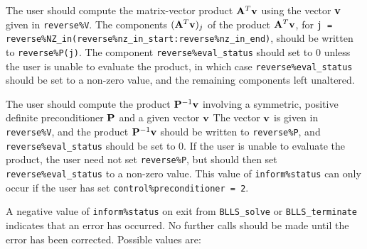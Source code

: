 \documentclass{galahad}
\newcommand{\packagename}{BLLS}
\begin{document}
\begin{description}
 The user should compute the matrix-vector product ${\mathbf{A}}^T {\mathbf{v}}$
     using the vector ${\mathbf{v}}$ given in {\tt reverse\%V}. The components
     $({\mathbf{A}}^T {\mathbf{v}})_j$ of the product ${\mathbf{A}}^T {\mathbf{v}}$, for
     {\tt j = reverse\%NZ\_in(reverse\%nz\_in\_start:reverse\%nz\_in\_end)},
     should be written to {\tt reverse\%P(j)}.
     The component {\tt reverse\%eval\_status} should set to 0 unless the
     user is unable to evaluate the product, in which case
     {\tt reverse\%eval\_status} should be set to a non-zero value, and the
      remaining components left unaltered.

 The user should compute the product ${\mathbf{P}}^{-1} {\mathbf{v}}$
     involving a symmetric, positive definite preconditioner ${\mathbf{P}}$
     and a given vector ${\mathbf{v}}$
     The vector ${\mathbf{v}}$ is given in {\tt reverse\%V}, and the
     product ${\mathbf{P}}^{-1} {\mathbf{v}}$ should be written to {\tt reverse\%P},
     and  {\tt reverse\%eval\_status} should be set to 0.
     If the user is unable to evaluate the product,
     the user need not set {\tt reverse\%P}, but
     should then set {\tt reverse\%eval\_status} to a non-zero value.
     This value of {\tt inform\%status} can only occur if the user
     has set {\tt control\%preconditioner = 2}.

\end{description}




\galerrors
A negative value of {\tt inform\%status} on exit from
{\tt \packagename\_solve}
or
{\tt \packagename\_terminate}
indicates that an error has occurred. No further calls should be made
until the error has been corrected. Possible values are:
\end{document}
